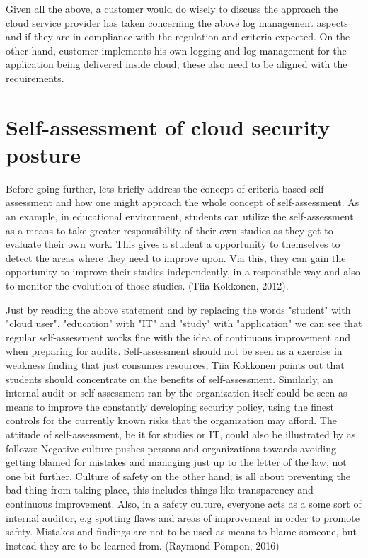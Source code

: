 \documentclass{article}
\begin{document}
\par
Given all the above, a customer would do wisely to discuss the approach the cloud service provider has taken concerning the above log management aspects and if they are in compliance with the regulation and criteria expected. On the other hand, customer implements his own logging and log management for the application being delivered inside cloud, these also need to be aligned with the requirements.
\section{Self-assessment of cloud security posture}
Before going further, lets briefly address the concept of criteria-based self-assessment and how one might approach the whole concept of self-assessment. 
As an example, in educational environment, students can utilize the self-assessment as a means to take greater responsibility of their own studies as they get to evaluate their own work. This gives a student a opportunity to themselves to detect the areas where they need to improve upon.
Via this, they can gain the opportunity to improve their studies independently, in a responsible way and also to monitor the evolution of those studies. (Tiia Kokkonen, 2012).
\par
Just by reading the above statement and by replacing the words "student" with "cloud user", "education" with "IT" and "study" with "application" we can see that regular self-assessment works fine with the idea of continuous improvement and when preparing for audits.
Self-assessment should not be seen as a exercise in weakness finding that just consumes resources, Tiia Kokkonen points out that students should concentrate on the benefits of self-assessment.
Similarly, an internal audit or self-assessment ran by the organization itself could be seen as means to improve the constantly developing security policy, using the finest controls for the currently known risks that the organization may afford.
The attitude of self-assessment, be it for studies or IT, could also be illustrated by as follows: Negative culture pushes persons and organizations towards avoiding getting blamed for mistakes and managing just up to the letter of the law, not one bit further.
Culture of safety on the other hand, is all about preventing the bad thing from taking place, this includes things like transparency and continuous improvement. Also, in a safety culture, everyone acts as a some sort of internal auditor, e.g spotting flaws and areas of improvement in order to promote safety. Mistakes and findings are not to be used as means to blame someone, but instead they are to be learned from. (Raymond Pompon, 2016)
\end{document}
